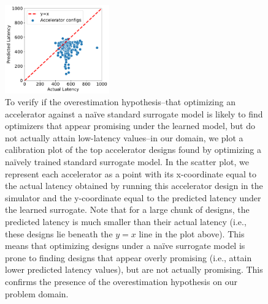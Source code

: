 \begin{figure}[ht]
    \centering
    \includegraphics[width=0.4\textwidth]{chapters/prime/figs/results/overestimation.pdf}
    \caption{To verify if the overestimation hypothesis--that optimizing an accelerator against a na\"ive standard surrogate model is likely to find optimizers that appear promising under the learned model, but do not actually attain low-latency values--in our domain, we plot a calibration plot of the top accelerator designs found by optimizing a na\"ively trained standard surrogate model. In the scatter plot, we represent each accelerator as a point with its x-coordinate equal to the actual latency obtained by running this accelerator design in the simulator and the y-coordinate equal to the predicted latency under the learned surrogate. Note that for a large chunk of designs, the predicted latency is much smaller than their actual latency (i.e., these designs lie beneath the $y=x$ line in the plot above). This means that optimizing designs under a na\"ive surrogate model is prone to finding designs that appear overly promising (i.e., attain lower predicted latency values), but are not actually promising. This confirms the presence of the overestimation hypothesis on our problem domain.}
    \label{fig:cali_plot}
    \vspace{-0.1in}
\end{figure}

